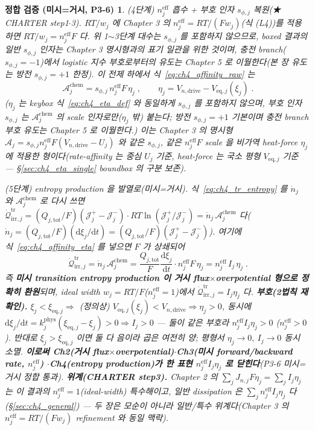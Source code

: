 \documentclass[11pt,a4paper]{article}
\newtheorem*{verifybox}{정합 검증 (미시=거시, P3-6)}
\newcommand{\dd}{\mathrm{d}}
\newcommand{\eff}{\mathrm{eff}}
\newcommand{\eq}{\mathrm{eq}}
\newcommand{\drive}{\mathrm{drive}}
\newcommand{\tot}{\mathrm{tot}}
\newcommand{\irr}{\mathrm{irr}}
\newcommand{\tr}{\mathrm{tr}}
\newcommand{\chem}{\mathrm{chem}}
\begin{document}
\begin{verifybox}
\emph{(4단계) $n_j^{\eff}$ 흡수 + 부호 인자 $s_{\phi,j}$ 복원(★ CHARTER step1$\cdot$3).} $RT/w_j$ 에 Chapter 3 의
$n_j^{\eff}=RT/(Fw_j)$(식 (L4))를 적용하면 $RT/w_j=n_j^{\eff}F$ 다. \emph{위 1$\sim$3단계 대수는 $s_{\phi,j}$ 를
포함하지 않으므로}, boxed 결과의 일반 $s_{\phi,j}$ 인자는 Chapter 3 명시형과의 \emph{표기 일관}을 위한 것이며,
충전 branch($s_{\phi,j}=-1$)에서 logistic 지수 부호로부터의 \emph{유도}는 Chapter 5 로 이월한다(본 장 유도는 방전
$s_{\phi,j}=+1$ 한정). 이 전제 하에서 식~\eqref{eq:ch4_affinity_raw} 는
\begin{equation}
\boxed{\;\mathcal A_j^{\chem}=s_{\phi,j}\,n_j^{\eff}F\,\eta_j\;,\qquad
\eta_j=V_{n,\drive}-V_{\eq,j}(\xi_j)\;.}
\label{eq:ch4_affinity_eta}
\end{equation}
($\eta_j$ 는 keybox 식~\eqref{eq:ch4_eta_def} 와 \emph{동일}하게 $s_{\phi,j}$ 를 \emph{포함하지 않으며}, 부호
인자 $s_{\phi,j}$ 는 $\mathcal A_j^{\chem}$ 의 scale 인자로만($\eta_j$ \emph{밖}) 붙는다; 방전 $s_{\phi,j}=+1$
기본이며 충전 branch 부호 \emph{유도}는 Chapter 5 로 이월한다.)
이는 Chapter 3 의 명시형 $\mathcal A_j=s_{\phi,j}n_j^{\eff}F(V_{n,\drive}-U_j)$ 와 \emph{같은 $s_{\phi,j}$,
같은 $n_j^{\eff}F$ scale} 을 비가역 \emph{heat-force} $\eta_j$ 에 적용한 형이다(rate-affinity 는 중심 $U_j$
기준, heat-force 는 국소 평형 $V_{\eq,j}$ 기준 — \S\ref{sec:ch4_eta_single} boundbox 의 구분 보존).

\emph{(5단계) entropy production 을 발열로(미시=거시).} 식~\eqref{eq:ch4_tr_entropy} 를 $\dot n_j$ 와
$\mathcal A_j^{\chem}$ 로 다시 쓰면 $\dot{\mathcal Q}_{\irr,j}^{\tr}=(Q_{j,\tot}/F)(\mathcal J_j^+-\mathcal J_j^-)
\cdot RT\ln(\mathcal J_j^+/\mathcal J_j^-)=\dot n_j\,\mathcal A_j^{\chem}$ 다($\dot n_j=(Q_{j,\tot}/F)(\dd\xi_j/\dd t)
=(Q_{j,\tot}/F)(\mathcal J_j^+-\mathcal J_j^-)$). 여기에 식~\eqref{eq:ch4_affinity_eta} 를 넣으면 $F$ 가 상쇄되어
\begin{equation}
\boxed{\;\dot{\mathcal Q}_{\irr,j}^{\tr}=\dot n_j\,\mathcal A_j^{\chem}
=\frac{Q_{j,\tot}}{F}\frac{\dd\xi_j}{\dd t}\cdot n_j^{\eff}F\,\eta_j
=n_j^{\eff}\,I_j\,\eta_j\;.}
\label{eq:ch4_micro_macro}
\end{equation}
즉 \textbf{미시 transition entropy production 이 거시 flux$\times$overpotential 형으로 정확히 환원}되며, ideal
width $w_j=RT/F$($n_j^{\eff}=1$)에서 $\dot{\mathcal Q}_{\irr,j}^{\tr}=I_j\eta_j$ 다. \textbf{부호(2법칙
재확인).} $\xi_j<\xi_{\eq,j}\Rightarrow$ (정의상) $V_{\eq,j}(\xi_j)<V_{n,\drive}\Rightarrow\eta_j>0$, 동시에
$\dd\xi_j/\dd t=k_j^{\mathrm{phys}}(\xi_{\eq,j}-\xi_j)>0\Rightarrow I_j>0$ — 둘이 같은 부호라 $n_j^{\eff}I_j\eta_j>0$
($n_j^{\eff}>0$). 반대로 $\xi_j>\xi_{\eq,j}$ 이면 둘 다 음이라 곱은 여전히 양; 평형서 $\eta_j\to0,\ I_j\to0$
동시 소멸. \textbf{이로써 Ch2(거시 flux$\times$overpotential)$\cdot$Ch3(미시 forward/backward rate, $n_j^{\eff}$)
$\cdot$Ch4(entropy production)가 한 표현 $n_j^{\eff}I_j\eta_j$ 로 닫힌다}(P3-6 미시=거시 정합 통과).
\textbf{위계(CHARTER step3).} \emph{Chapter 2 의 $\sum_j J_{n,j}F\eta_j=\sum_j I_j\eta_j$ 는 이 결과의
$n_j^{\eff}=1$(ideal-width) 특수해}이고, 일반 dissipation 은 $\sum_j n_j^{\eff}I_j\eta_j$ 다(\S\ref{sec:ch4_general})
— 두 장은 모순이 아니라 일반/특수 위계다(Chapter 3 의 $n_j^{\eff}=RT/(Fw_j)$ refinement 와 동일 맥락).
\end{verifybox}
\end{document}
